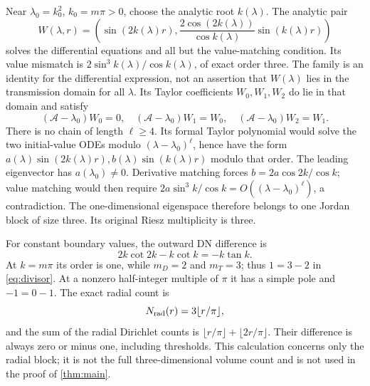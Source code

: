 \documentclass[11pt,a4paper]{article}
\theoremstyle{remark}
\numberwithin{equation}{section}
\begin{document}
Near $\lambda_0=k_0^2$, $k_0=m\pi>0$, choose the analytic root $k(\lambda)$.
The analytic pair
\[
 W(\lambda,r)=\left(\sin(2k(\lambda)r),
 \frac{2\cos(2k(\lambda))}{\cos k(\lambda)}\sin(k(\lambda)r)\right)
\]
solves the differential equations and all but the value-matching
condition. Its value mismatch is
$2\sin^3 k(\lambda)/\cos k(\lambda)$, of exact order three.
The family is an identity for the differential expression, not an
assertion that $W(\lambda)$ lies in the transmission domain for all
$\lambda$. Its Taylor coefficients $W_0,W_1,W_2$ do lie in that
domain and satisfy
\[
 (\mathcal A-\lambda_0)W_0=0,\quad
 (\mathcal A-\lambda_0)W_1=W_0,\quad
 (\mathcal A-\lambda_0)W_2=W_1.
\]
There is no chain of length $\ell\ge4$. Its formal Taylor polynomial
would solve the two initial-value ODEs modulo
$(\lambda-\lambda_0)^\ell$, hence have the form
$a(\lambda)\sin(2k(\lambda)r),b(\lambda)\sin(k(\lambda)r)$ modulo
that order. The leading eigenvector has $a(\lambda_0)\ne0$.
Derivative matching forces
$b=2a\cos2k/\cos k$; value matching would then require
$2a\sin^3k/\cos k=O((\lambda-\lambda_0)^\ell)$, a contradiction.
The one-dimensional eigenspace therefore belongs to one Jordan block
of size three. Its original Riesz multiplicity is three.

For constant boundary values, the outward DN difference is
\[
 2k\cot2k-k\cot k=-k\tan k.
\]
At $k=m\pi$ its order is one, while $m_D=2$ and $m_T=3$;
thus $1=3-2$ in \eqref{eq:divisor}. At a nonzero half-integer
multiple of $\pi$ it has a simple pole and $-1=0-1$.
The exact radial count is
\[
 N_{\rm rad}(r)=3\lfloor r/\pi\rfloor,
\]
and the sum of the radial Dirichlet counts is
$\lfloor r/\pi\rfloor+\lfloor2r/\pi\rfloor$. Their difference is
always zero or minus one, including thresholds. This calculation concerns
only the radial block; it is not the full three-dimensional volume count
and is not used in the proof of \cref{thm:main}.
\end{document}
